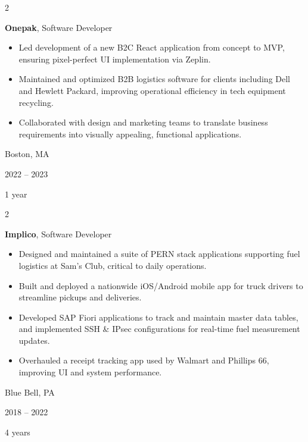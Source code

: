 \documentclass[10pt, letterpaper]{article}
\newenvironment{highlights}{
    \begin{itemize}[
        topsep=0.10 cm,
        parsep=0.08 cm,
        partopsep=0pt,
        itemsep=0pt,
        leftmargin=0.4 cm + 10pt
    ]
}{
    \end{itemize}
} %
\newenvironment{twocolentry}[2][]{
    \onecolentry
    \def\secondColumn{#2}
    \setcolumnwidth{\fill, 4.5 cm}
    \begin{paracol}{2}
}{
    \switchcolumn \raggedleft \secondColumn
    \end{paracol}
    \endonecolentry
} %
\begin{document}
        \vspace{0.13 cm}

        \begin{twocolentry}{
            Boston, MA

        2022 – 2023

        1 year
        }
            \textbf{Onepak}, Software Developer
            \begin{highlights}
                \item Led development of a new B2C React application from concept to MVP, ensuring pixel-perfect UI implementation via Zeplin.
                \item Maintained and optimized B2B logistics software for clients including Dell and Hewlett Packard, improving operational efficiency in tech equipment recycling.
                \item Collaborated with design and marketing teams to translate business requirements into visually appealing, functional applications.
            \end{highlights}
        \end{twocolentry}


        \vspace{0.13 cm}

        \begin{twocolentry}{
            Blue Bell, PA

        2018 – 2022

        4 years
        }
            \textbf{Implico}, Software Developer
            \begin{highlights}
                \item Designed and maintained a suite of PERN stack applications supporting fuel logistics at Sam’s Club, critical to daily operations.
                \item Built and deployed a nationwide iOS/Android mobile app for truck drivers to streamline pickups and deliveries.
                \item Developed SAP Fiori applications to track and maintain master data tables, and implemented SSH \& IPsec configurations for real-time fuel measurement updates.
                \item Overhauled a receipt tracking app used by Walmart and Phillips 66, improving UI and system performance.
            \end{highlights}
        \end{twocolentry}
\end{document}
